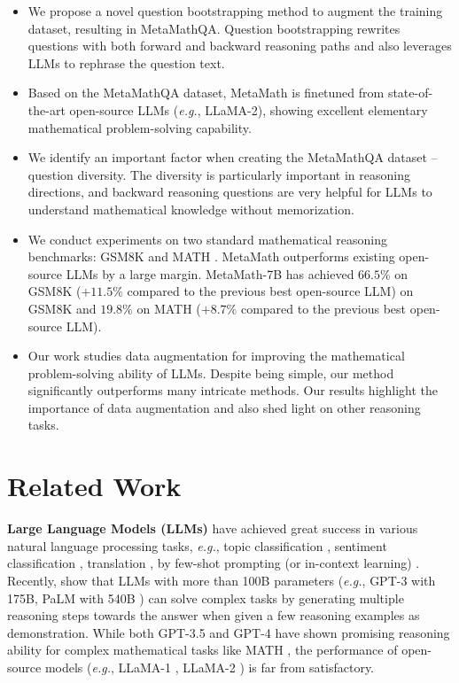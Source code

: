 \begin{itemize}[leftmargin=*,nosep]

        \item We propose a novel question bootstrapping method to augment the training dataset, resulting in MetaMathQA. Question bootstrapping rewrites questions with both forward and backward reasoning paths and also leverages LLMs to rephrase the question text.
        \item Based on the MetaMathQA dataset, MetaMath is finetuned from state-of-the-art open-source LLMs (\emph{e.g.}, LLaMA-2), showing excellent elementary mathematical problem-solving capability.
        \item We identify an important factor when creating the MetaMathQA dataset -- question diversity. The diversity is particularly important in reasoning directions, and backward reasoning questions are very helpful for LLMs to understand mathematical knowledge without memorization.
        \item We conduct experiments on two standard mathematical reasoning benchmarks: GSM8K \citep{cobbe2021training} and MATH \citep{hendrycks2021measuring}.  MetaMath outperforms existing open-source LLMs by a large margin. MetaMath-7B has achieved $66.5\%$ on GSM8K ($+11.5\%$ compared to the previous best open-source LLM) on GSM8K and $19.8\%$ on MATH ($+8.7\%$ compared to the previous best open-source LLM).
        \item Our work studies data augmentation for improving the mathematical problem-solving ability of LLMs. Despite being simple, our method significantly outperforms many intricate methods. Our results highlight the importance of data augmentation and also shed light on other reasoning tasks.
    \end{itemize}

    \section{Related Work}

    \textbf{Large Language Models (LLMs)} \cite{devlin2019bert, liu2019roberta, gpt2, Colin2020t5,brown2020language, touvron2023llama1, sun2023survey} have achieved great success in various natural language processing tasks, \emph{e.g.}, topic classification \citep{min2022metaicl, jiang2023effective, jiang2023byom}, sentiment classification \citep{brown2020language, min2022metaicl}, translation \citep{brown2020language}, by few-shot prompting (or in-context learning) \citep{brown2020language, min2022metaicl, chen2022meta}. Recently, \citet{wei2022chain,wang2023selfconsistency} show that LLMs with more than 100B parameters (\emph{e.g.}, GPT-3 \citep{brown2020language} with 175B, PaLM with 540B \citep{chowdhery2022palm}) can solve complex tasks by generating multiple reasoning steps towards the answer when given a few reasoning examples as demonstration. While both GPT-3.5 \citep{gpt3-5} and GPT-4 \citep{gpt4} have shown promising reasoning ability for complex mathematical tasks like MATH \cite{hendrycks2021measuring}, the performance of open-source models (\emph{e.g.}, LLaMA-1 \citep{touvron2023llama1}, LLaMA-2 \citep{touvron2023llama}) is far from satisfactory.

